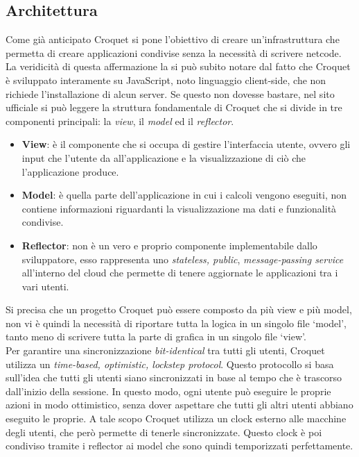 \subsection{Architettura}\label{subsec:Croquet_architettura}
Come già anticipato Croquet si pone l'obiettivo di creare un'infrastruttura che permetta di creare applicazioni condivise senza la necessità di scrivere netcode. La veridicità di
questa affermazione la si può subito notare dal fatto che Croquet è sviluppato interamente su JavaScript, noto linguaggio client-side, che non richiede l'installazione di alcun server. 
Se questo non dovesse bastare, nel sito ufficiale si può leggere la struttura fondamentale di Croquet che si divide in tre componenti principali: la \textit{view}, il \textit{model}
ed il \textit{reflector}.
\begin{itemize}
    \item \textbf{View}: è il componente che si occupa di gestire l'interfaccia utente, ovvero gli input che l'utente da all'applicazione e la visualizzazione di ciò che
    l'applicazione produce. 
    \item \textbf{Model}: è quella parte dell'applicazione in cui i calcoli vengono eseguiti, non contiene informazioni riguardanti la visualizzazione ma dati e 
    funzionalità condivise.
    \item \textbf{Reflector}: non è un vero e proprio componente implementabile dallo sviluppatore, esso rappresenta uno \textit{stateless, public}, \textit{message-passing service}
    all'interno del cloud che permette di tenere aggiornate le applicazioni tra i vari utenti.
\end{itemize}
Si precisa che un progetto Croquet può essere composto da più view e più model, non vi è quindi la necessità di riportare tutta la logica in un singolo file `model', tanto meno di
scrivere tutta la parte di grafica in un singolo file `view'.\\
Per garantire una sincronizzazione \textit{bit-identical} tra tutti gli utenti, Croquet utilizza un \textit{time-based, optimistic, lockstep protocol}. Questo protocollo si basa
sull'idea che tutti gli utenti siano sincronizzati in base al tempo che è trascorso dall'inizio della sessione. In questo modo, ogni utente può eseguire le proprie azioni in modo
ottimistico, senza dover aspettare che tutti gli altri utenti abbiano eseguito le proprie. A tale scopo Croquet utilizza un clock esterno alle macchine degli utenti, che però
permette di tenerle sincronizzate. Questo clock è poi condiviso tramite i reflector ai model che sono quindi temporizzati perfettamente.\\
